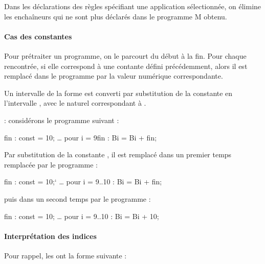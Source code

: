 \documentclass[letterpaper,10pt,french]{sphinxmanual}
\begin{document}
\sphinxAtStartPar
Dans les déclarations des règles spécifiant une application sélectionnée, on
élimine les enchaîneurs qui ne sont plus déclarés dans le programme M obtenu.


\paragraph{Cas des constantes}
\label{\detokenize{mlang:cas-des-constantes}}
\sphinxAtStartPar
Pour prétraiter un programme, on le parcourt du début à la fin. Pour chaque
 rencontrée, si elle correspond à une contante défini précédemment,
alors il est remplacé dans le programme par la valeur numérique correspondante.

\sphinxAtStartPar
Un intervalle de la forme  est
converti par substitution de la constante  en l’intervalle
, avec  le naturel correspondant
à .

\sphinxAtStartPar
{} : considérons le programme suivant :

\begin{sphinxVerbatim}[commandchars=\\\{\}]
fin : const = 10;
… 
pour i = 9\PYGZhy{}fin :
  Bi = Bi + fin;
\end{sphinxVerbatim}

\sphinxAtStartPar
Par substitution de la constante , il est remplacé dans un premier temps
remplacée par le programme :

\begin{sphinxVerbatim}[commandchars=\\\{\}]
fin : const = 10;`
… 
pour i = 9..10 :
  Bi = Bi + fin;
\end{sphinxVerbatim}

\sphinxAtStartPar
puis dans un second temps par le programme :

\begin{sphinxVerbatim}[commandchars=\\\{\}]
fin : const = 10;
…
pour i = 9..10 :
  Bi = Bi + 10;
\end{sphinxVerbatim}


\paragraph{Interprétation des indices}
\label{\detokenize{mlang:interpretation-des-indices}}
\sphinxAtStartPar
Pour rappel, les  ont la forme suivante :
\end{document}
